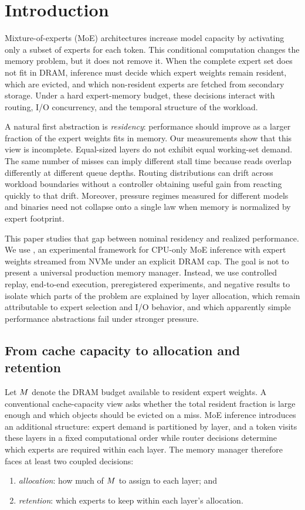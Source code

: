 \section{Introduction}
\label{sec:introduction}

Mixture-of-experts (MoE) architectures increase model capacity by activating only a subset of experts for each token. This conditional computation changes the memory problem, but it does not remove it. When the complete expert set does not fit in DRAM, inference must decide which expert weights remain resident, which are evicted, and which non-resident experts are fetched from secondary storage. Under a hard expert-memory budget, these decisions interact with routing, I/O concurrency, and the temporal structure of the workload.

A natural first abstraction is \emph{residency}: performance should improve as a larger fraction of the expert weights fits in memory. Our measurements show that this view is incomplete. Equal-sized layers do not exhibit equal working-set demand. The same number of misses can imply different stall time because reads overlap differently at different queue depths. Routing distributions can drift across workload boundaries without a controller obtaining useful gain from reacting quickly to that drift. Moreover, pressure regimes measured for different models and binaries need not collapse onto a single law when memory is normalized by expert footprint.

This paper studies that gap between nominal residency and realized performance. We use \argine{}, an experimental framework for CPU-only MoE inference with expert weights streamed from NVMe under an explicit DRAM cap. The goal is not to present a universal production memory manager. Instead, we use controlled replay, end-to-end execution, preregistered experiments, and negative results to isolate which parts of the problem are explained by layer allocation, which remain attributable to expert selection and I/O behavior, and which apparently simple performance abstractions fail under stronger pressure.

\subsection{From cache capacity to allocation and retention}

Let $M$ denote the DRAM budget available to resident expert weights. A conventional cache-capacity view asks whether the total resident fraction is large enough and which objects should be evicted on a miss. MoE inference introduces an additional structure: expert demand is partitioned by layer, and a token visits these layers in a fixed computational order while router decisions determine which experts are required within each layer. The memory manager therefore faces at least two coupled decisions:
\begin{enumerate}
    \item \emph{allocation}: how much of $M$ to assign to each layer; and
    \item \emph{retention}: which experts to keep within each layer's allocation.
\end{enumerate}

